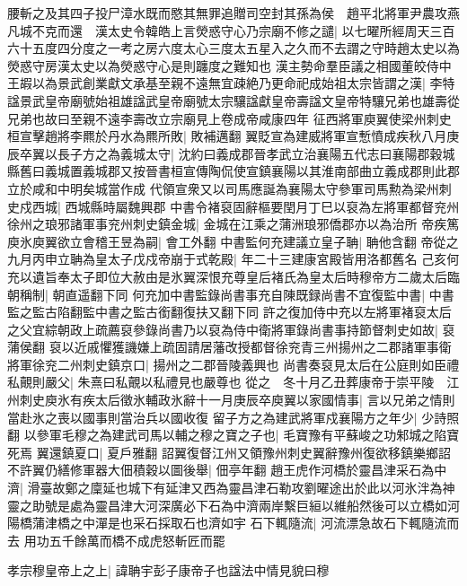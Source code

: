 腰斬之及其四子投尸漳水既而愍其無罪追贈司空封其孫為侯　趙平北將軍尹農攻燕凡城不克而還　漢太史令韓皓上言熒惑守心乃宗廟不修之譴|{
	以七曜所經周天三百六十五度四分度之一考之房六度太心三度太五星入之久而不去謂之守時趙太史以為熒惑守房漢太史以為熒惑守心是則躔度之難知也}
漢主勢命羣臣議之相國董皎侍中王嘏以為景武創業獻文承基至親不遠無宜疎絶乃更命祀成始祖太宗皆謂之漢|{
	李特諡景武皇帝廟號始祖雄諡武皇帝廟號太宗驤諡獻皇帝壽諡文皇帝特驤兄弟也雄壽從兄弟也故曰至親不遠李壽改立宗廟見上卷成帝咸康四年}
征西將軍庾翼使梁州刺史桓宣擊趙將李羆於丹水為羆所敗|{
	敗補邁翻}
翼貶宣為建威將軍宣慙憤成疾秋八月庚辰卒翼以長子方之為義城太守|{
	沈約曰義成郡晉孝武立治襄陽五代志曰襄陽郡穀城縣舊曰義城置義城郡又按晉書桓宣傳陶侃使宣鎮襄陽以其淮南部曲立義成郡則此郡立於咸和中明矣城當作成}
代領宣衆又以司馬應誕為襄陽太守參軍司馬勲為梁州刺史戍西城|{
	西城縣時屬魏興郡}
中書令褚裒固辭樞要閏月丁巳以裒為左將軍都督兖州徐州之琅邪諸軍事兖州刺史鎮金城|{
	金城在江乘之蒲洲琅邪僑郡亦以為治所}
帝疾篤庾氷庾翼欲立會稽王昱為嗣|{
	會工外翻}
中書監何充建議立皇子聃|{
	聃他含翻}
帝從之九月丙申立聃為皇太子戊戍帝崩于式乾殿|{
	年二十三建康宮殿皆用洛都舊名}
己亥何充以遺旨奉太子即位大赦由是氷翼深恨充尊皇后褚氏為皇太后時穆帝方二歲太后臨朝稱制|{
	朝直遥翻下同}
何充加中書監錄尚書事充自陳既録尚書不宜復監中書|{
	中書監之監古陷翻監中書之監古銜翻復扶又翻下同}
許之復加侍中充以左將軍褚裒太后之父宜綜朝政上疏薦裒參錄尚書乃以裒為侍中衛將軍錄尚書事持節督刺史如故|{
	裒蒲侯翻}
裒以近戚懼獲譏嫌上疏固請居藩改授都督徐兖青三州揚州之二郡諸軍事衛將軍徐兖二州刺史鎮京口|{
	揚州之二郡晉陵義興也}
尚書奏裒見太后在公庭則如臣禮私覿則嚴父|{
	朱熹曰私覿以私禮見也嚴尊也}
從之　冬十月乙丑葬康帝于崇平陵　江州刺史庾氷有疾太后徵氷輔政氷辭十一月庚辰卒庾翼以家國情事|{
	言以兄弟之情則當赴氷之喪以國事則當治兵以國收復}
留子方之為建武將軍戍襄陽方之年少|{
	少詩照翻}
以參軍毛穆之為建武司馬以輔之穆之寶之子也|{
	毛寶豫有平蘇峻之功邾城之陷寶死焉}
翼還鎮夏口|{
	夏戶雅翻}
詔翼復督江州又領豫州刺史翼辭豫州復欲移鎮樂鄉詔不許翼仍繕修軍器大佃積穀以圖後舉|{
	佃亭年翻}
趙王虎作河橋於靈昌津采石為中濟|{
	滑臺故鄭之廩延也城下有延津又西為靈昌津石勒攻劉曜途出於此以河氷泮為神靈之助號是處為靈昌津大河深廣必下石為中濟兩岸繫巨絙以維船然後可以立橋如河陽橋蒲津橋之中潬是也采石採取石也濟如宇}
石下輒隨流|{
	河流漂急故石下輒隨流而去}
用功五千餘萬而橋不成虎怒斬匠而罷

孝宗穆皇帝上之上|{
	諱聃宇彭子康帝子也諡法中情見貌曰穆}


